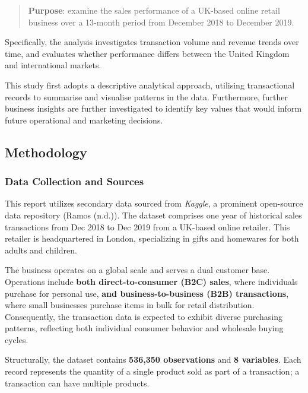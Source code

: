 \documentclass[
  letterpaper,
  DIV=11,
  numbers=noendperiod]{scrartcl}
\begin{document}
\begin{quote}
\textbf{Purpose}: examine the sales performance of a UK-based online
retail business over a 13-month period from December 2018 to December
2019.
\end{quote}

Specifically, the analysis investigates transaction volume and revenue
trends over time, and evaluates whether performance differs between the
United Kingdom and international markets.

This study first adopts a descriptive analytical approach, utilising
transactional records to summarise and visualise patterns in the data.
Furthermore, further business insights are further investigated to
identify key values that would inform future operational and marketing
decisions.

\subsection{Methodology}\label{methodology}

\subsubsection{Data Collection and
Sources}\label{data-collection-and-sources}

This report utilizes secondary data sourced from \emph{Kaggle}, a
prominent open-source data repository (Ramos (n.d.)). The dataset
comprises one year of historical sales transactions from Dec 2018 to Dec
2019 from a UK-based online retailer. This retailer is headquartered in
London, specializing in gifts and homewares for both adults and
children.

The business operates on a global scale and serves a dual customer base.
Operations include \textbf{both direct-to-consumer (B2C) sales}, where
individuals purchase for personal use, \textbf{and business-to-business
(B2B) transactions}, where small businesses purchase items in bulk for
retail distribution. Consequently, the transaction data is expected to
exhibit diverse purchasing patterns, reflecting both individual consumer
behavior and wholesale buying cycles.

Structurally, the dataset contains \textbf{536,350 observations} and
\textbf{8 variables}. Each record represents the quantity of a single
product sold as part of a transaction; a transaction can have multiple
products.
\end{document}
